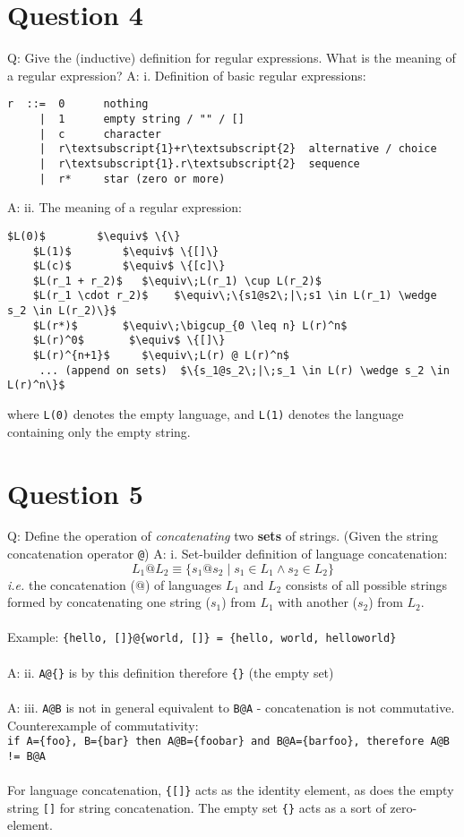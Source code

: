 \documentclass[english]{scrartcl}
\begin{document}
\section*{Question 4}
Q: Give the (inductive) definition for regular expressions.
   What is the meaning of a regular expression?
\newline
A: i. Definition of basic regular expressions:
\begin{Verbatim}[commandchars=\\\{\}]
r  ::=  0      nothing
     |  1      empty string / "" / []
     |  c      character
     |  r\textsubscript{1}+r\textsubscript{2}  alternative / choice
     |  r\textsubscript{1}.r\textsubscript{2}  sequence
     |  r*     star (zero or more)
\end{Verbatim}
A: ii. The meaning of a regular expression:
\begin{Verbatim}[mathescape,commandchars=\\\{\}]
    $L(0)$        $\equiv$ \{\}
    $L(1)$        $\equiv$ \{[]\}
    $L(c)$        $\equiv$ \{[c]\}
    $L(r_1 + r_2)$   $\equiv\;L(r_1) \cup L(r_2)$
    $L(r_1 \cdot r_2)$    $\equiv\;\{s1@s2\;|\;s1 \in L(r_1) \wedge s_2 \in L(r_2)\}$
    $L(r*)$       $\equiv\;\bigcup_{0 \leq n} L(r)^n$
    $L(r)^0$       $\equiv$ \{[]\}
    $L(r)^{n+1}$     $\equiv\;L(r) @ L(r)^n$
     ... (append on sets)  $\{s_1@s_2\;|\;s_1 \in L(r) \wedge s_2 \in L(r)^n\}$
\end{Verbatim}
where \verb.L(0). denotes the empty language, and \verb.L(1). denotes the language containing only the empty string.

\section*{Question 5}
Q: Define the operation of \textit{concatenating} two \textbf{sets} of strings. (Given the string concatenation operator \verb.@.)
\newline
A: i. Set-builder definition of language concatenation:
\[
L_1 @ L_2 \equiv \{ s_1 @ s_2 \;|\; s_1 \in L_1 \wedge s_2 \in L_2 \}
\]
\textit{i.e.} the concatenation ($@$) of languages $L_1$ and $L_2$ consists of all possible strings
formed by concatenating one string ($s_1$) from $L_1$ with another ($s_2$) from $L_2$.
\\ \\
Example: \verb.{hello, []}@{world, []} = {hello, world, helloworld}.
\\ \\
A: ii. \verb.A@{}. is by this definition therefore \verb.{}. (the empty set)
\\ \\
A: iii. \verb.A@B. is not in general equivalent to \verb.B@A. - concatenation is not commutative.
Counterexample of commutativity: \\
\verb.if A={foo}, B={bar} then A@B={foobar} and B@A={barfoo}, therefore A@B != B@A . \\
\\
For language concatenation, \verb.{[]}. acts as the identity element, as does the empty string \verb.[]. for string concatenation.
The empty set \verb.{}. acts as a sort of zero-element.
\end{document}
